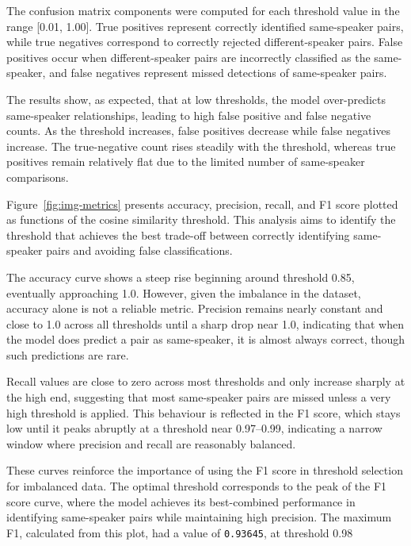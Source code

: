 \documentclass[conference]{IEEEtran}
\begin{document}
	The confusion matrix components were computed for each threshold value in the range [0.01, 1.00]. True positives represent correctly identified same-speaker pairs, while true negatives correspond to correctly rejected different-speaker pairs. False positives occur when different-speaker pairs are incorrectly classified as the same-speaker, and false negatives represent missed detections of same-speaker pairs.
	
	The results show, as expected, that at low thresholds, the model over-predicts same-speaker relationships, leading to high false positive and false negative counts. As the threshold increases, false positives decrease while false negatives increase. The true-negative count rises steadily with the threshold, whereas true positives remain relatively flat due to the limited number of same-speaker comparisons.
	
	Figure~\ref{fig:img-metrics} presents accuracy, precision, recall, and F1 score plotted as functions of the cosine similarity threshold. This analysis aims to identify the threshold that achieves the best trade-off between correctly identifying same-speaker pairs and avoiding false classifications.
	
	The accuracy curve shows a steep rise beginning around threshold 0.85, eventually approaching 1.0. However, given the imbalance in the dataset, accuracy alone is not a reliable metric. Precision remains nearly constant and close to 1.0 across all thresholds until a sharp drop near 1.0, indicating that when the model does predict a pair as same-speaker, it is almost always correct, though such predictions are rare.
	
	Recall values are close to zero across most thresholds and only increase sharply at the high end, suggesting that most same-speaker pairs are missed unless a very high threshold is applied. This behaviour is reflected in the F1 score, which stays low until it peaks abruptly at a threshold near 0.97–0.99, indicating a narrow window where precision and recall are reasonably balanced.
	
	These curves reinforce the importance of using the F1 score in threshold selection for imbalanced data. The optimal threshold corresponds to the peak of the F1 score curve, where the model achieves its best-combined performance in identifying same-speaker pairs while maintaining high precision. The maximum F1, calculated from this plot, had a value of \texttt{0.93645}, at threshold 0.98
	
	
\end{document}
